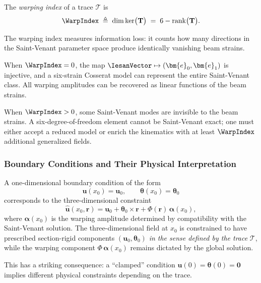 \begin{definition}
\label{def:warping-index}
The \emph{warping index} of a trace $\mathcal{T}$ is
\begin{equation}
\WarpIndex
\;\triangleq\;
\dim \ker\!\big(\mathbf{T}\big)
\;=\;
6 - \operatorname{rank}\!\big(\mathbf{T}\big).
\label{eq:def-warp-index}
\end{equation}
\end{definition}

The warping index measures information loss: it counts how many directions in 
the Saint-Venant parameter space produce identically vanishing beam strains.

When $\WarpIndex = 0$, the map $\IesanVector \mapsto (\bm{e}_0, \bm{e}_1)$ is 
injective, and a six-strain Cosserat model can represent the entire 
Saint-Venant class. All warping amplitudes can be recovered as linear 
functions of the beam strains.

When $\WarpIndex > 0$, some Saint-Venant modes are invisible to the beam 
strains. A six-degree-of-freedom element cannot be Saint-Venant exact; one 
must either accept a reduced model or enrich the kinematics with at least 
$\WarpIndex$ additional generalized fields.


\subsubsection{Boundary Conditions and Their Physical Interpretation}

A one-dimensional boundary condition of the form
\begin{equation}
\bm{u}(x_0) = \bm{u}_0, \qquad \bm{\theta}(x_0) = \bm{\theta}_0
\label{eq:1d-bc}
\end{equation}
corresponds to the three-dimensional constraint
\begin{equation}
\hat{\bm{u}}(x_0, \bm{r}) = \bm{u}_0 + \bm{\theta}_0 \times \bm{r} 
+ \Phi(\bm{r})\,\bm{\alpha}(x_0),
\label{eq:3d-bc}
\end{equation}
where $\bm{\alpha}(x_0)$ is the warping amplitude determined by compatibility 
with the Saint-Venant solution. The three-dimensional field at $x_0$ is 
constrained to have prescribed section-rigid components $(\bm{u}_0, \bm{\theta}_0)$ 
\emph{in the sense defined by the trace} $\mathcal{T}$, while the warping 
component $\Phi\,\bm{\alpha}(x_0)$ remains dictated by the global solution.

This has a striking consequence: a ``clamped'' condition 
$\bm{u}(0) = \bm{\theta}(0) = \mathbf{0}$ implies different physical constraints 
depending on the trace.

